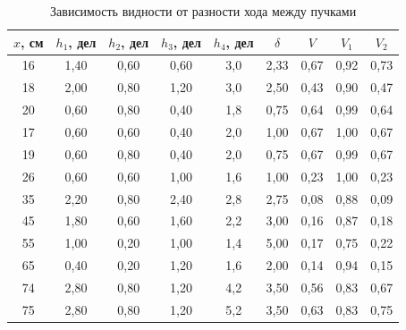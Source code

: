 \documentclass[a4paper]{article}
\begin{document}
    \begin{table}[!ht]
        \centering
        \caption{Зависимость видности от разности хода между пучками}
        \begin{tabular}{|c|c|c|c|c|c|c|c|c|}
        \hline
        $x$, см & $h_1$, дел & $h_2$, дел & $h_3$, дел & $h_4$, дел & $\delta$ & $V$  & $V_1$ & $V_2$ \\ \hline
        16  & 1,40  & 0,60  & 0,60  & 3,0   & 2,33     & 0,67 & 0,92  & 0,73  \\ \hline
        18  & 2,00  & 0,80  & 1,20  & 3,0   & 2,50     & 0,43 & 0,90  & 0,47  \\ \hline
        20  & 0,60  & 0,80  & 0,40  & 1,8   & 0,75     & 0,64 & 0,99  & 0,64  \\ \hline
        17  & 0,60  & 0,60  & 0,40  & 2,0   & 1,00     & 0,67 & 1,00  & 0,67  \\ \hline
        19  & 0,60  & 0,80  & 0,40  & 2,0   & 0,75     & 0,67 & 0,99  & 0,67  \\ \hline
        26  & 0,60  & 0,60  & 1,00  & 1,6   & 1,00     & 0,23 & 1,00  & 0,23  \\ \hline
        35  & 2,20  & 0,80  & 2,40  & 2,8   & 2,75     & 0,08 & 0,88  & 0,09  \\ \hline
        45  & 1,80  & 0,60  & 1,60  & 2,2   & 3,00     & 0,16 & 0,87  & 0,18  \\ \hline
        55  & 1,00  & 0,20  & 1,00  & 1,4   & 5,00     & 0,17 & 0,75  & 0,22  \\ \hline
        65  & 0,40  & 0,20  & 1,20  & 1,6   & 2,00     & 0,14 & 0,94  & 0,15  \\ \hline
        74  & 2,80  & 0,80  & 1,20  & 4,2   & 3,50     & 0,56 & 0,83  & 0,67  \\ \hline
        75  & 2,80  & 0,80  & 1,20  & 5,2   & 3,50     & 0,63 & 0,83  & 0,75  \\ \hline
        \end{tabular}
        \end{table}
\end{document}
